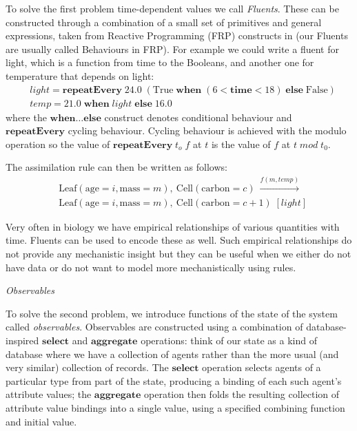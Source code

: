 To solve the first problem time-dependent values we call \textit{Fluents}. These
can be constructed through a combination of a small set of primitives and
general expressions, taken from Reactive Programming (FRP) constructs in
\citep{wan_functional_2000} (our Fluents are usually called Behaviours in FRP). For
example we could write a fluent for light, which is a function from time to the
Booleans, and another one for temperature that depends on light:
\begin{align*}
& light = \mathbf{repeatEvery} \; 24.0 \; (\mathrm{True} \; \mathbf{when} \; (6 < \mathbf{time} < 18) \; \mathbf{else} \; \mathrm{False}) \\
& temp = 21.0 \; \mathbf{when} \; light \; \mathbf{else} \; 16.0
\end{align*}
where the $\mathbf{when} \dotso \mathbf{else}$ construct denotes conditional
behaviour and $\mathbf{repeatEvery}$ cycling behaviour. Cycling behaviour is
achieved with the modulo operation so the value of $\mathbf{repeatEvery} \; t_o
\; f$ at $t$ is the value of $f$ at $t \; mod \; t_0$.

The assimilation rule can then be written as follows:
\begin{align*}
& \mathrm{Leaf}(\mathrm{age} \!= \!i, \mathrm{mass} \!= \!m), \: \mathrm{Cell}(\mathrm{carbon} \!= \!c) \: \xrightarrow{f(m, temp)}  \\
&\mathrm{Leaf}(\mathrm{age} \!= \!i, \mathrm{mass} \!= \!m), \:
  \mathrm{Cell}(\mathrm{carbon} \!= \!c+1) \; [light ]
\end{align*}

Very often in biology we have empirical relationships of various quantities with
time. Fluents can be used to encode these as well. Such empirical relationships
do not provide any mechanistic insight but they can be useful when we either do
not have data or do not want to model more mechanistically using rules.

\textit{Observables}

To solve the second problem, we introduce functions of the state of the system
called \textit{observables}. Observables are constructed using a combination of
database-inspired $\mathbf{select}$ and $\mathbf{aggregate}$ operations: %
think of our state as a kind of database where we have a collection of agents
rather than the more usual (and very similar) collection of records. The $
\mathbf{select}$ operation selects agents of a particular type from %
part of the state, producing a binding of each such agent's attribute values;
the $\mathbf{aggregate}$ operation then folds the resulting collection of
attribute value bindings into a single value, using a specified combining
function and initial value.

